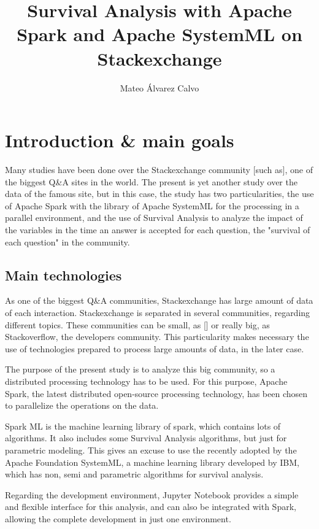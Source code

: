 \documentclass[11pt]{article} %
\title{Survival Analysis with Apache Spark and Apache SystemML on Stackexchange}
\author{Mateo Álvarez Calvo}
\begin{document}
\maketitle

\newpage
\tableofcontents
\newpage

\section{Introduction \& main goals}

  Many studies have been done over the Stackexchange community [such as], one of the biggest Q\&A sites in the world. The present is yet another study over the data of the famous site, but in this case, the study has two particularities, the use of Apache Spark with the library of Apache SystemML for the processing in a parallel environment, and the use of Survival Analysis to analyze the impact of the variables in the time an answer is accepted for each question, the "survival of each question" in the community.


  \subsection{Main technologies}

    As one of the biggest Q\&A communities, Stackexchange has large amount of data of each interaction.
    Stackexchange is separated in several communities, regarding different topics. These communities can be small, as [] or really big, as Stackoverflow, the developers community. This particularity makes necessary the use of technologies prepared to process large amounts of data, in the later case.

    The purpose of the present study is to analyze this big community, so a distributed processing technology has to be used. For this purpose, Apache Spark, the latest distributed open-source processing technology, has been chosen to parallelize the operations on the data.

    Spark ML is the machine learning library of spark, which contains lots of algorithms. It also includes some Survival Analysis algorithms, but just for parametric modeling. This gives an excuse to use the recently adopted by the Apache Foundation SystemML, a machine learning library developed by IBM, which has non, semi and parametric algorithms for survival analysis.

    Regarding the development environment, Jupyter Notebook provides a simple and flexible interface for this analysis, and can also be integrated with Spark, allowing the complete development in just one environment.
\end{document}
